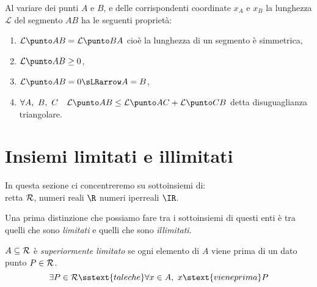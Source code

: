 Al variare dei punti \(A\) e \(B\), e delle corrispondenti coordinate 
\(x_A\) e \(x_B\) la lunghezza \(\mathcal{L}\) del segmento \(AB\) ha le 
seguenti proprietà:
\begin{enumerate}
\item \(\lung{A}{B} = \lung{B}{A}\) 
cioè la lunghezza di un segmento è simmetrica,
\item \(\lung{A}{B} \geq 0\),
\item \(\lung{A}{B} = 0 \sLRarrow A = B\),
\item \(\forall A,~B,~C \quad \lung{A}{B} \leq \lung{A}{C} + \lung{C}{B}\) 
detta disuguaglianza triangolare.
\end{enumerate}

\section{Insiemi limitati e illimitati}
\label{sec:topologiainsiemi}

In questa sezione ci concentreremo su sottoinsiemi di: \\
\hspace*{30mm}
retta \(\mathcal{R}\), \quad numeri reali \(\R\) \quad numeri iperreali \(\IR\).

% 


Una prima distinzione che possiamo fare tra i sottoinsiemi di questi enti 
è tra quelli che sono \emph{limitati} e quelli che sono \emph{illimitati}.

\begin{newdef}{}{}
\(A \subseteq \mathcal{R}\) è \emph{superiormente limitato} se 
ogni elemento di \(A\) viene prima di un dato punto \(P \in \mathcal{R}\).
\[\exists P \in \retta \sstext{tale che} 
  \forall x \in A,~ x \stext{viene prima} P\]
\end{newdef}

